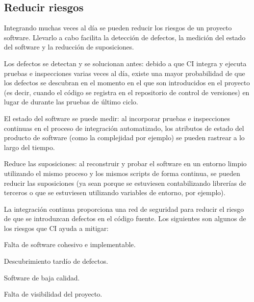 \subsection{Reducir riesgos}
Integrando muchas veces al día se pueden reducir los riesgos de un proyecto software. Llevarlo a cabo facilita la detección de defectos, la medición del estado del software y la reducción de suposiciones.
\begin{compactitem}
    \item Los defectos se detectan y se solucionan antes: debido a que CI integra y ejecuta pruebas e inspecciones varias veces al día, existe una mayor probabilidad de que los defectos se descubran en el momento en el que son introducidos en el proyecto (es decir, cuando el código se registra en el repositorio de control de versiones) en lugar de durante las pruebas de último ciclo.
    \item El estado del software se puede medir: al incorporar pruebas e inspecciones continuas en el proceso de integración automatizado, los atributos de estado del producto de software (como la complejidad por ejemplo) se pueden rastrear a lo largo del tiempo.
    \item Reduce las suposiciones: al reconstruir y probar el software en un entorno limpio utilizando el mismo proceso y los mismos scripts de forma continua, se pueden reducir las suposiciones (ya sean porque se estuviesen contabilizando librerías de terceros o que se estuviesen utilizando variables de entorno, por ejemplo).
\end{compactitem}
La integración continua proporciona una red de seguridad para reducir el riesgo de que se introduzcan defectos en el código fuente. Los siguientes son algunos de los riesgos que CI ayuda a mitigar:
\begin{compactitem}
    \item Falta de software cohesivo e implementable.
    \item Descubrimiento tardío de defectos.
    \item Software de baja calidad.
    \item Falta de visibilidad del proyecto.
\end{compactitem}
